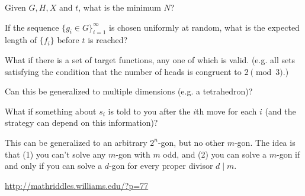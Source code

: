 \documentclass{article}
\begin{document}
\begin{related}
  \item Given $G, H, X$ and $t$, what is the minimum $N$?
  \item If the sequence $\{g_i \in G\}_{i=1}^\infty$ is chosen uniformly at
  random, what is the expected length of $\{f_i\}$ before $t$ is reached?
  \item What if there is a set of target functions, any one of which is valid.
  (e.g. all sets satisfying the condition that the number of heads is congruent
  to $2 \pmod 3$.)
  \item Can this be generalized to multiple dimensions (e.g. a tetrahedron)?
  \item What if something about $s_i$ is told to you after the $i$th move for each
    $i$ (and the strategy can depend on this information)?
\end{related}

\begin{note}
  This can be generalized to an arbitrary $2^n$-gon, but no other $m$-gon.
  The idea is that (1) you can't solve any $m$-gon with $m$ odd, and (2) you
  can solve a $m$-gon if and only if you can solve a $d$-gon for every proper
  divisor $d \mid m$.
\end{note}

\begin{references}
  \item \url{http://mathriddles.williams.edu/?p=77}
\end{references}
\end{document}
